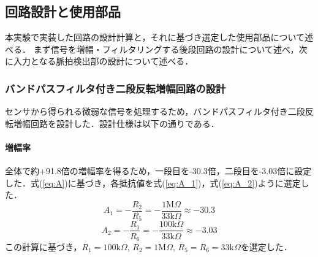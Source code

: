 \subsection{回路設計と使用部品}
本実験で実装した回路の設計計算と，それに基づき選定した使用部品について述べる．
まず信号を増幅・フィルタリングする後段回路の設計について述べ，次に入力となる脈拍検出部の設計について述べる．


\subsubsection{バンドパスフィルタ付き二段反転増幅回路の設計}
センサから得られる微弱な信号を処理するため，バンドパスフィルタ付き二段反転増幅回路を設計した．設計仕様は以下の通りである．

\paragraph{増幅率}
全体で約+91.8倍の増幅率を得るため，一段目を-30.3倍，二段目を-3.03倍に設定した．式(\ref{eq:A})に基づき，各抵抗値を式(\ref{eq:A_1})，式(\ref{eq:A_2})ように選定した．
\begin{equation}
  A_1 = -\frac{R_2}{R_5} = -\frac{1\text{M}\Omega}{33\text{k}\Omega} \approx -30.3 \label{eq:A_1}
\end{equation}
\begin{equation}
  A_2 = -\frac{R_1}{R_6} = -\frac{100\text{k}\Omega}{33\text{k}\Omega} \approx -3.03 \label{eq:A_2}
\end{equation}
この計算に基づき，$R_1=100\text{k}\Omega$, $R_2=1\text{M}\Omega$, $R_5=R_6=33\text{k}\Omega$を選定した．

